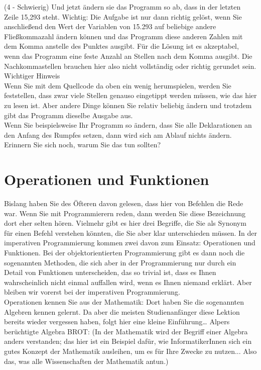 (4 - Schwierig) Und jetzt ändern sie das Programm so ab, dass in der letzten Zeile 15,293 steht. Wichtig: Die Aufgabe ist nur dann richtig gelöst, wenn Sie anschließend den Wert der Variablen von 15.293 auf beliebige andere Fließkommazahl ändern können und das Programm diese anderen Zahlen mit dem Komma anstelle des Punktes ausgibt. Für die Lösung ist es akzeptabel, wenn das Programm eine feste Anzahl an Stellen nach dem Komma ausgibt. Die Nachkommastellen brauchen hier also nicht vollständig oder richtig gerundet sein.\\

Wichtiger Hinweis\\

Wenn Sie mit dem Quellcode da oben ein wenig herumspielen, werden Sie feststellen, dass zwar viele Stellen genauso eingetippt werden müssen, wie das hier zu lesen ist. Aber andere Dinge können Sie relativ beliebig ändern und trotzdem gibt das Programm dieselbe Ausgabe aus.\\

Wenn Sie beispielsweise Ihr Programm so ändern, dass Sie alle Deklarationen an den Anfang des Rumpfes setzen, dann wird sich am Ablauf nichts ändern. Erinnern Sie sich noch, warum Sie das tun sollten?\\

\section{Operationen und Funktionen}

Bislang haben Sie des Öfteren davon gelesen, dass hier von Befehlen die Rede war. Wenn Sie mit Programmierern reden, dann werden Sie diese Bezeichnung dort eher selten hören. Vielmehr gibt es hier drei Begriffe, die Sie als Synonym für einen Befehl verstehen könnten, die Sie aber klar unterschieden müssen. In der imperativen Programmierung kommen zwei davon zum Einsatz: Operationen und Funktionen. Bei der objektorientierten Programmierung gibt es dann noch die sogenannten Methoden, die sich aber in der Programmierung nur durch ein Detail von Funktionen unterscheiden, das so trivial ist, dass es Ihnen wahrscheinlich nicht einmal auffallen wird, wenn es Ihnen niemand erklärt. Aber bleiben wir vorerst bei der imperativen Programmierung.\\

Operationen kennen Sie aus der Mathematik: Dort haben Sie die sogenannten Algebren kennen gelernt. Da aber die meisten Studienanfänger diese Lektion bereits wieder vergessen haben, folgt hier eine kleine Einführung… Alpers berüchtigte Algebra BROT: (In der Mathematik wird der Begriff einer Algebra anders verstanden; das hier ist ein Beispiel dafür, wie InformatikerInnen sich ein gutes Konzept der Mathematik ausleihen, um es für Ihre Zwecke zu nutzen... Also das, was alle Wissenschaften der Mathematik antun.)

